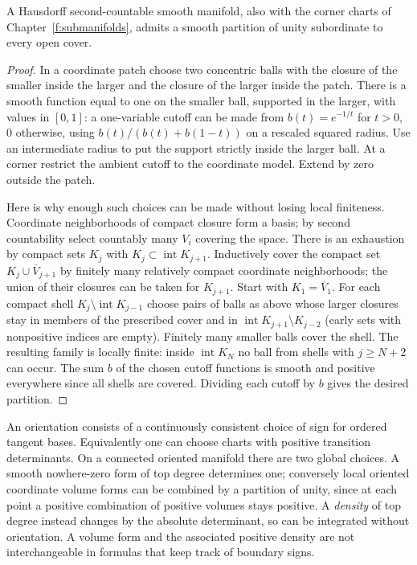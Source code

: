 \begin{theorem}\label{f:partition}
A Hausdorff second-countable smooth manifold, also with the corner charts of Chapter~\ref{f:submanifolds}, admits a smooth partition of unity subordinate to every open cover.
\end{theorem}
\begin{proof}
In a coordinate patch choose two concentric balls with the closure of the smaller inside the larger and the closure of the larger inside the patch. There is a smooth function equal to one on the smaller ball, supported in the larger, with values in $[0,1]$: a one-variable cutoff can be made from $b(t)=e^{-1/t}$ for $t>0$, $0$ otherwise, using $b(t)/(b(t)+b(1-t))$ on a rescaled squared radius. Use an intermediate radius to put the support strictly inside the larger ball. At a corner restrict the ambient cutoff to the coordinate model. Extend by zero outside the patch.

Here is why enough such choices can be made without losing local finiteness. Coordinate neighborhoods of compact closure form a basis; by second countability select countably many $V_i$ covering the space. There is an exhaustion by compact sets $K_j$ with $K_j\subset\operatorname{int}K_{j+1}$. Inductively cover the compact set $K_j\cup\overline V_{j+1}$ by finitely many relatively compact coordinate neighborhoods; the union of their closures can be taken for $K_{j+1}$. Start with $K_1=\overline V_1$. For each compact shell $K_j\setminus\operatorname{int}K_{j-1}$ choose pairs of balls as above whose larger closures stay in members of the prescribed cover and in $\operatorname{int}K_{j+1}\setminus K_{j-2}$ (early sets with nonpositive indices are empty). Finitely many smaller balls cover the shell. The resulting family is locally finite: inside $\operatorname{int}K_N$ no ball from shells with $j\ge N+2$ can occur. The sum $b$ of the chosen cutoff functions is smooth and positive everywhere since all shells are covered. Dividing each cutoff by $b$ gives the desired partition.
\end{proof}

\label{f:orientation-density}An orientation consists of a continuously consistent choice of sign for ordered tangent bases. Equivalently one can choose charts with positive transition determinants. On a connected oriented manifold there are two global choices. A smooth nowhere-zero form of top degree determines one; conversely local oriented coordinate volume forms can be combined by a partition of unity, since at each point a positive combination of positive volumes stays positive. A \emph{density} of top degree instead changes by the absolute determinant, so can be integrated without orientation. A volume form and the associated positive density are not interchangeable in formulas that keep track of boundary signs.

